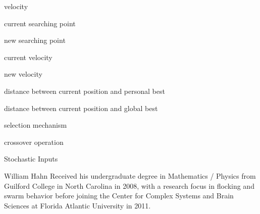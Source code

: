 \documentclass[8pt,journal,compsoc]{IEEEtran}
\begin{document}
velocity

current searching point 

new searching point

current velocity 

new velocity

distance between current position and personal best 

distance between current position and global best 

selection mechanism 

crossover operation 

Stochastic Inputs




\clearpage




\begin{IEEEbiographynophoto}{William Hahn}    
Received his undergraduate degree in Mathematics / Physics from Guilford College in North Carolina in 2008, with a research focus in flocking and swarm behavior before joining the Center for Complex Systems and Brain Sciences at Florida Atlantic University in 2011.
\end{IEEEbiographynophoto}
\begin{figure}[h!]
\leavevmode      
\makebox{}       
\end{figure}
\end{document}
